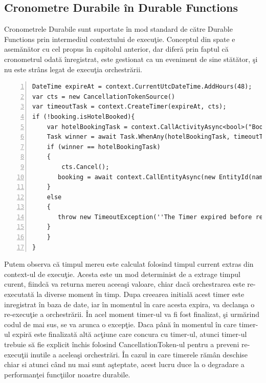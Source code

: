 \documentclass[a4paper,12pt]{report}
\begin{document}
\subsection{Cronometre Durabile în Durable Functions}
\quad Cronometrele Durabile sunt suportate în mod standard de către Durable Functions prin intermediul contextului de execuţie. Conceptul din spate e asemănător cu cel propus în capitolul anterior, dar diferă prin faptul că cronometrul odată înregistrat, este gestionat ca un eveniment de sine stătător, şi nu este strâns legat de execuţia orchestrării. 
\begin{lstlisting}[numbers=left]
DateTime expireAt = context.CurrentUtcDateTime.AddHours(48);
var cts = new CancellationTokenSource()
var timeoutTask = context.CreateTimer(expireAt, cts);
if (!booking.isHotelBooked){
	var hotelBookingTask = context.CallActivityAsync<bool>("BookFlight", null);
	Task winner = await Task.WhenAny(hotelBookingTask, timeoutTask);
    if (winner == hotelBookingTask)
    {
    	cts.Cancel();
       booking = await context.CallEntityAsync(new EntityId(nameof(Booking), entityGuid),"UpdateFlight", isFlightBooked);
    }
    else
    {
       throw new TimeoutException(''The Timer expired before receiving a response from the hotel activity'');
    }
	}	
}
\end{lstlisting}
\par Putem observa că timpul mereu este calculat folosind timpul current extras din context-ul de execuţie. Acesta este un mod determinist de a extrage timpul curent, fiindcă va returna mereu aceeaşi valoare, chiar dacă orchestrarea este re-executată la diverse moment în timp. Dupa creearea initială acest timer este inregistrat în baza de date, iar în momentul în care acesta expira, va declanşa o re-execuţie a orchestrării. În acel moment timer-ul va fi fost finalizat, şi urmărind codul de mai sus, se va arunca o excepţie. Daca până în momentul în care timer-ul expiră este finalizată altă acţiune care concura cu timer-ul, atunci timer-ul trebuie să fie explicit închis folosind CancellationToken-ul pentru a preveni re-execuţii inutile a aceleaşi orchestrări. În cazul in care timerele rămân deschise chiar si atunci când nu mai sunt aşteptate, acest lucru duce la o degradare a performanţei funcţiilor noastre durabile. 
\end{document}
